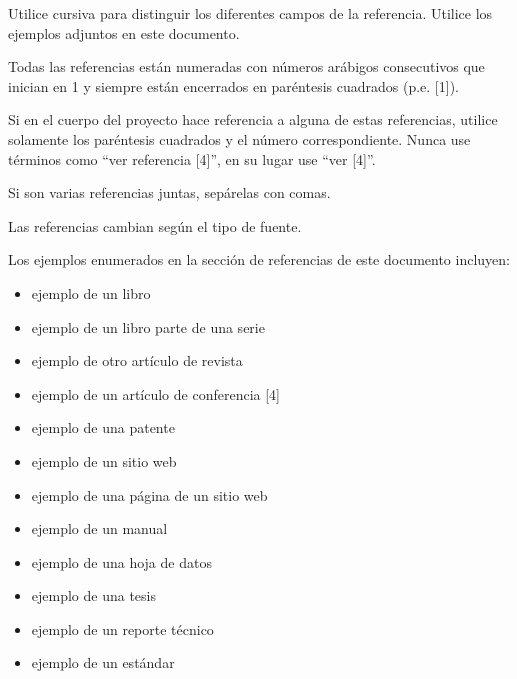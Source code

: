 Utilice cursiva para distinguir los diferentes campos de la referencia. Utilice
los ejemplos adjuntos en este documento.

Todas las referencias están numeradas con números arábigos consecutivos que
inician en 1 y siempre están encerrados en paréntesis cuadrados (p.e. [1]).

Si en el cuerpo del proyecto hace referencia a alguna de estas referencias,
utilice solamente los paréntesis cuadrados y el número correspondiente. Nunca use
términos como “ver referencia [4]”, en su lugar use “ver [4]”.

Si son varias referencias juntas, sepárelas con comas.

Las referencias cambian según el tipo de fuente.

Los ejemplos enumerados en la sección de referencias de este documento incluyen:

\begin{itemize}
	\item ejemplo de un libro \cite{MetevVeiko1998}

	\item ejemplo de un libro parte de una serie \cite{Breckling1989}

	\item ejemplo de otro artículo de revista \cite{Zhang1999}

	\item ejemplo de un artículo de conferencia [4] \cite{Wegmuller2000}

	\item ejemplo de una patente \cite{Sorace1997}

	\item ejemplo de un sitio web \cite{IEEEwebsite}

	\item ejemplo de una página de un sitio web \cite{IEEEtran}

	\item ejemplo de un manual \cite{Motorola1996}

	\item ejemplo de una hoja de datos \cite{OptoSpeedSA}

	\item ejemplo de una tesis \cite{Karnik1999}

	\item ejemplo de un reporte técnico \cite{Padhye1999}

	\item ejemplo de un estándar \cite{IEEE802.11}
\end{itemize}

